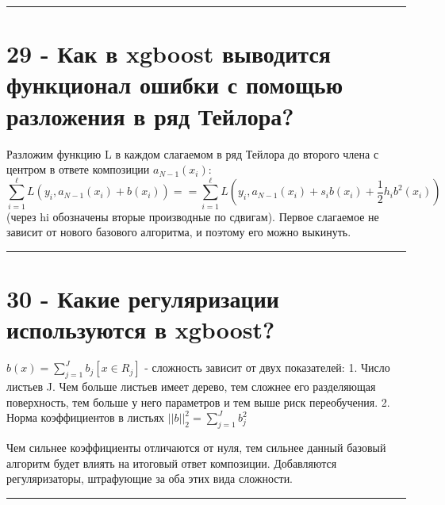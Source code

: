 \documentclass[11pt]{article}
\begin{document}
    \begin{center}\rule{0.5\linewidth}{\linethickness}\end{center}

    \section{29 - Как в xgboost выводится функционал ошибки с помощью
разложения в ряд
Тейлора?}\label{ux43aux430ux43a-ux432-xgboost-ux432ux44bux432ux43eux434ux438ux442ux441ux44f-ux444ux443ux43dux43aux446ux438ux43eux43dux430ux43b-ux43eux448ux438ux431ux43aux438-ux441-ux43fux43eux43cux43eux449ux44cux44e-ux440ux430ux437ux43bux43eux436ux435ux43dux438ux44f-ux432-ux440ux44fux434-ux442ux435ux439ux43bux43eux440ux430}

Разложим функцию L в каждом слагаемом в ряд Тейлора до второго члена с
центром в ответе композиции \(a_{N−1}(x_i)\):
\[\sum_{i=1}^ℓL(y_i, a_{N−1}(x_i) + b(x_i)) == \sum_{i=1}^ℓL(y_i, a_{N−1}(x_i) + s_ib(x_i)+\frac{1}{2}h_ib^2(x_i))\]
(через hi обозначены вторые производные по сдвигам). Первое слагаемое не
зависит от нового базового алгоритма, и поэтому его можно выкинуть.

    \begin{center}\rule{0.5\linewidth}{\linethickness}\end{center}

    \section{30 - Какие регуляризации используются в
xgboost?}\label{ux43aux430ux43aux438ux435-ux440ux435ux433ux443ux43bux44fux440ux438ux437ux430ux446ux438ux438-ux438ux441ux43fux43eux43bux44cux437ux443ux44eux442ux441ux44f-ux432-xgboost}

\(b(x) = \sum_{j=1}^Jb_j[x ∈ R_j]\) - сложность зависит от двух
показателей: 1. Число листьев J. Чем больше листьев имеет дерево, тем
сложнее его разделяющая поверхность, тем больше у него параметров и тем
выше риск переобучения. 2. Норма коэффициентов в листьях
\(||b||_2^2 = \sum_{j=1}^J b_j^2\)

Чем сильнее коэффициенты отличаются от нуля, тем сильнее данный базовый
алгоритм будет влиять на итоговый ответ композиции. Добавляются
регуляризаторы, штрафующие за оба этих вида сложности.

    \begin{center}\rule{0.5\linewidth}{\linethickness}\end{center}
\end{document}
